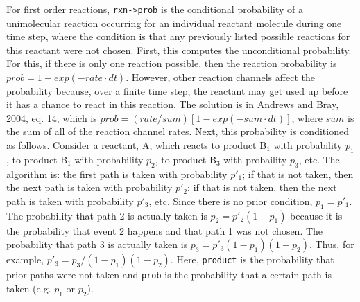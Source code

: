 \documentclass {book}
\begin{document}
\begin{description}
For first order reactions, \texttt{rxn->prob} is the conditional probability of a unimolecular reaction occurring for an individual reactant molecule during one time step, where the condition is that any previously listed possible reactions for this reactant were not chosen. First, this computes the unconditional probability. For this, if there is only one reaction possible, then the reaction probability is $prob=1-exp(-rate \cdot dt)$. However, other reaction channels affect the probability because, over a finite time step, the reactant may get used up before it has a chance to react in this reaction. The solution is in Andrews and Bray, 2004, eq. 14, which is $prob=(rate/sum)[1-exp(-sum \cdot dt)]$, where $sum$ is the sum of all of the reaction channel rates. Next, this probability is conditioned as follows. Consider a reactant, A, which reacts to product B$_1$ with probability $p_{1}$, to product B$_1$ with probability $p_2$, to product B$_3$ with probaility $p_3$, etc. The algorithm is: the first path is taken with probability $p'_1$; if that is not taken, then the next path is taken with probability $p'_2$; if that is not taken, then the next path is taken with probability $p'_3$, etc. Since there is no prior condition, $p_1=p'_1$. The probability that path 2 is actually taken is $p_2=p'_{2}(1-p_1)$ because it is the probability that event 2 happens and that path 1 was not chosen. The probability that path 3 is actually taken is $p_3=p'_{3}(1-p_1)(1-p_2)$. Thus, for example, $p'_3=p_3/(1-p_1)(1-p_2)$. Here, \texttt{product} is the probability that prior paths were not taken and \texttt{prob} is the probability that a certain path is taken (e.g. $p_1$ or $p_2$).


\end{description}
\end{document}
